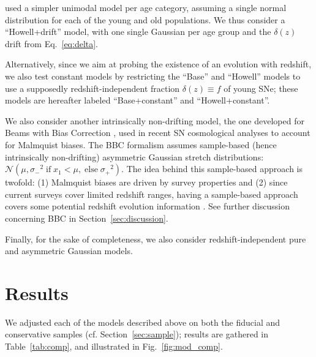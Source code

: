 \documentclass[]{aa}
\begin{document}
\cite{howell2007} used a simpler unimodal model per age category, assuming a
single normal distribution for each of the young and old populations.  We thus
consider a ``Howell+drift'' model, with one single Gaussian per age group and
the $\delta(z)$ drift from Eq.~\ref{eq:delta}.

Alternatively, since we aim at probing the existence of an evolution with
redshift, we also test constant models by restricting the ``Base'' and
``Howell'' models to use a supposedly redshift-independent fraction $\delta(z)
\equiv f$ of young SNe; these models are hereafter labeled ``Base+constant'' and
``Howell+constant''.

We also consider another intrinsically non-drifting model, the one developed for
Beams with Bias Correction \cite[BBC,][]{scolnic2016, kessler2017}, used in
recent SN cosmological analyses \cite[e.g.][]{scolnic2018a, descosmopaper2019,
riess2016, riess2019} to account for Malmquist biases. The BBC formalism assumes
sample-based (hence intrinsically non-drifting) asymmetric Gaussian stretch
distributions: $\mathcal{N}\left(\mu,
\sigma_-{}^2\;\text{if}\;x_1<\mu,\;\text{else}\;\sigma_+{}^2\right)$. The idea
behind this sample-based approach is twofold: (1) Malmquist biases are driven by
survey properties and (2) since current surveys cover limited redshift ranges,
having a sample-based approach covers some potential redshift evolution
information \citep{scolnic2016, scolnic2018a}. See further discussion concerning
BBC in Section~\ref{sec:discussion}. 

Finally, for the sake of completeness, we also consider redshift-independent
pure and asymmetric Gaussian models. 

\section{Results}\label{sec:results}

We adjusted each of the models described above on both the fiducial and
conservative samples (cf. Section~\ref{sec:sample}); results are gathered
in Table~\ref{tab:comp}, and illustrated in Fig.~\ref{fig:mod_comp}. 
\end{document}
